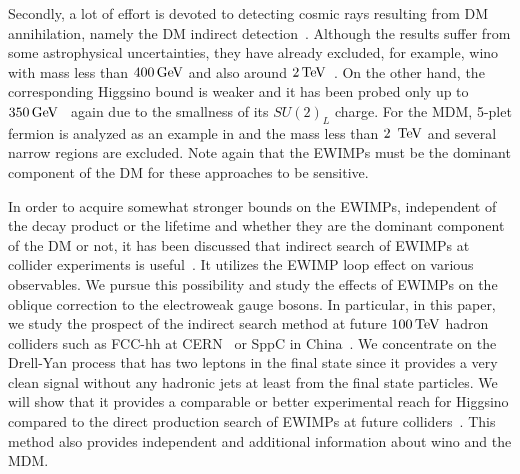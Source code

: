 \documentclass[12pt,twoside,book]{article}
\begin{document}
Secondly, a lot of effort is devoted to detecting cosmic rays resulting from DM annihilation, namely the DM indirect detection~\cite{Fermi-LAT:2016uux, Ahnen:2016qkx, Abdallah:2016ygi, Gomez-Vargas:2013bea}.
Although the results suffer from some astrophysical uncertainties, they have already excluded, for example, wino with mass less than $400\,{\rm GeV}$ and also around $2\,{\rm TeV}$~\cite{Bhattacherjee:2014dya}.
On the other hand, the corresponding Higgsino bound is weaker and it has been probed only up to $350\,{\rm GeV}$~\cite{Krall:2017xij} again due to the smallness of its $SU(2)_L$ charge.
For the MDM, 5-plet fermion is analyzed as an example in \cite{Abdalla:2018mve} and the mass less than $2\,~{\rm TeV}$ and several narrow regions are excluded.
Note again that the EWIMPs must be the dominant component of the DM for these approaches to be sensitive.

In order to acquire somewhat stronger bounds on the EWIMPs, independent of the decay product or the lifetime and whether they are the dominant component of the DM or not, it has been discussed that indirect search of EWIMPs at collider experiments is useful~\cite{Alves:2014cda, Gross:2016ioi, Farina:2016rws, Harigaya:2015yaa, Matsumoto:2017vfu}.
It utilizes the EWIMP loop effect on various observables.  We pursue this possibility and study the effects of EWIMPs on the oblique correction to the electroweak gauge bosons.  In particular, in this paper, we study the prospect of the indirect search method at future $100\,{\rm TeV}$ hadron colliders such as FCC-hh at CERN~\cite{Mangano:2016jyj, Contino:2016spe, Golling:2016gvc} or SppC in China~\cite{CEPC-SPPCStudyGroup:2015csa, CEPC-SPPCStudyGroup:2015esa}.
We concentrate on the Drell-Yan process that has two leptons in the final state since it provides a very clean signal without any hadronic jets at least from the final state particles.
We will show that it provides a comparable or better experimental reach for Higgsino compared to the direct production search of EWIMPs at future colliders~\cite{Low:2014cba, Cirelli:2014dsa, Han:2018wus, Mahbubani:2017gjh}.
This method also provides independent and additional information about wino and the MDM.




\end{document}
